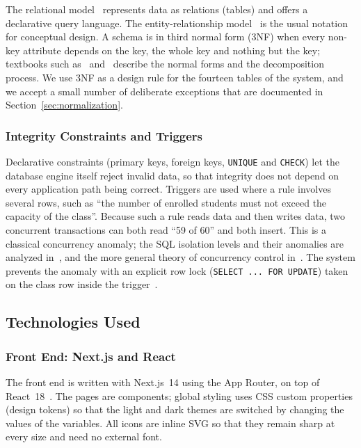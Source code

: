 The relational model~\cite{codd1970relational} represents data as relations (tables) and offers a declarative query language. The entity-relationship model~\cite{chen1976entity} is the usual notation for conceptual design. A schema is in third normal form (3NF) when every non-key attribute depends on the key, the whole key and nothing but the key; textbooks such as~\cite{silberschatz2019database} and~\cite{elmasri2015fundamentals} describe the normal forms and the decomposition process. We use 3NF as a design rule for the fourteen tables of the system, and we accept a small number of deliberate exceptions that are documented in Section~\ref{sec:normalization}.

\subsubsection{Integrity Constraints and Triggers}

Declarative constraints (primary keys, foreign keys, \texttt{UNIQUE} and \texttt{CHECK}) let the database engine itself reject invalid data, so that integrity does not depend on every application path being correct. Triggers are used where a rule involves several rows, such as ``the number of enrolled students must not exceed the capacity of the class''. Because such a rule reads data and then writes data, two concurrent transactions can both read ``59 of 60'' and both insert. This is a classical concurrency anomaly; the SQL isolation levels and their anomalies are analyzed in~\cite{berenson1995critique}, and the more general theory of concurrency control in~\cite{bernstein1981concurrency}. The system prevents the anomaly with an explicit row lock (\texttt{SELECT ... FOR UPDATE}) taken on the class row inside the trigger~\cite{postgresdocs}.

\subsection{Technologies Used}

\subsubsection{Front End: Next.js and React}

The front end is written with Next.js~14 using the App Router, on top of React~18~\cite{nextjsdocs, reactdocs}. The pages are components; global styling uses CSS custom properties (design tokens) so that the light and dark themes are switched by changing the values of the variables. All icons are inline SVG so that they remain sharp at every size and need no external font.

